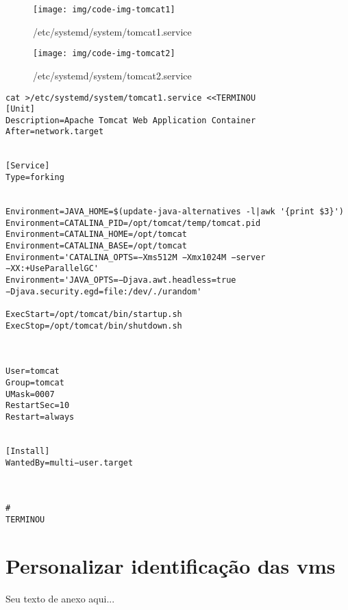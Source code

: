 \begin{figure}[H]
	\centering
	\caption[tomcat1.service]{/etc/systemd/system/tomcat1.service}
	\texttt{[image: img/code-img-tomcat1]}
	\label{fig:tomcat1.service}
\end{figure}

\begin{figure}[H]
	\centering
	\caption[tomcat2.service]{/etc/systemd/system/tomcat2.service}
	\texttt{[image: img/code-img-tomcat2]}
	\label{fig:tomcat2.service}
\end{figure}
	
\begin{lstlisting}[breaklines=true,basicstyle=\scriptsize,	breaklines=true, label=servico01,showspaces=false,showstringspaces=false,caption={Script exemplo para gerar arquivo de serviço}]
cat >/etc/systemd/system/tomcat1.service <<TERMINOU
[Unit]
Description=Apache Tomcat Web Application Container
After=network.target


[Service]
Type=forking


Environment=JAVA_HOME=$(update-java-alternatives -l|awk '{print $3}')
Environment=CATALINA_PID=/opt/tomcat/temp/tomcat.pid
Environment=CATALINA_HOME=/opt/tomcat
Environment=CATALINA_BASE=/opt/tomcat
Environment='CATALINA_OPTS=−Xms512M −Xmx1024M −server −XX:+UseParallelGC'
Environment='JAVA_OPTS=−Djava.awt.headless=true −Djava.security.egd=file:/dev/./urandom'

ExecStart=/opt/tomcat/bin/startup.sh
ExecStop=/opt/tomcat/bin/shutdown.sh



User=tomcat
Group=tomcat
UMask=0007
RestartSec=10
Restart=always


[Install]
WantedBy=multi−user.target



#
TERMINOU
\end{lstlisting}

\section{Personalizar identificação das vms}

Seu texto de anexo aqui...
